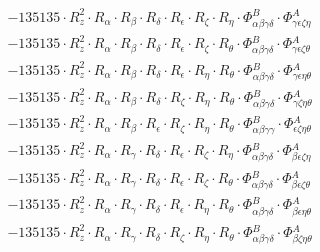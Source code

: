 \documentclass{article}
\begin{document}
\begin{subequations}
\begin{gather}
\begin{array}{c}
 \\[0.2em] 		 - 135135 \cdot R_{z}^{2} \cdot R_{\alpha{}} \cdot R_{\beta{}} \cdot R_{\delta{}} \cdot R_{\epsilon{}} \cdot R_{\zeta{}} \cdot R_{\eta{}} \cdot \Phi{}^{B}_{\alpha{}\beta{}\gamma{}\delta{}} \cdot \Phi{}^{A}_{\gamma{}\epsilon{}\zeta{}\eta{}} 
 \\[0.2em] 		 - 135135 \cdot R_{z}^{2} \cdot R_{\alpha{}} \cdot R_{\beta{}} \cdot R_{\delta{}} \cdot R_{\epsilon{}} \cdot R_{\zeta{}} \cdot R_{\theta{}} \cdot \Phi{}^{B}_{\alpha{}\beta{}\gamma{}\delta{}} \cdot \Phi{}^{A}_{\gamma{}\epsilon{}\zeta{}\theta{}} 
 \\[0.2em] 		 - 135135 \cdot R_{z}^{2} \cdot R_{\alpha{}} \cdot R_{\beta{}} \cdot R_{\delta{}} \cdot R_{\epsilon{}} \cdot R_{\eta{}} \cdot R_{\theta{}} \cdot \Phi{}^{B}_{\alpha{}\beta{}\gamma{}\delta{}} \cdot \Phi{}^{A}_{\gamma{}\epsilon{}\eta{}\theta{}} 
 \\[0.2em] 		 - 135135 \cdot R_{z}^{2} \cdot R_{\alpha{}} \cdot R_{\beta{}} \cdot R_{\delta{}} \cdot R_{\zeta{}} \cdot R_{\eta{}} \cdot R_{\theta{}} \cdot \Phi{}^{B}_{\alpha{}\beta{}\gamma{}\delta{}} \cdot \Phi{}^{A}_{\gamma{}\zeta{}\eta{}\theta{}} 
 \\[0.2em] 		 - 135135 \cdot R_{z}^{2} \cdot R_{\alpha{}} \cdot R_{\beta{}} \cdot R_{\epsilon{}} \cdot R_{\zeta{}} \cdot R_{\eta{}} \cdot R_{\theta{}} \cdot \Phi{}^{B}_{\alpha{}\beta{}\gamma{}\gamma{}} \cdot \Phi{}^{A}_{\epsilon{}\zeta{}\eta{}\theta{}} 
 \\[0.2em] 		 - 135135 \cdot R_{z}^{2} \cdot R_{\alpha{}} \cdot R_{\gamma{}} \cdot R_{\delta{}} \cdot R_{\epsilon{}} \cdot R_{\zeta{}} \cdot R_{\eta{}} \cdot \Phi{}^{B}_{\alpha{}\beta{}\gamma{}\delta{}} \cdot \Phi{}^{A}_{\beta{}\epsilon{}\zeta{}\eta{}} 
 \\[0.2em] 		 - 135135 \cdot R_{z}^{2} \cdot R_{\alpha{}} \cdot R_{\gamma{}} \cdot R_{\delta{}} \cdot R_{\epsilon{}} \cdot R_{\zeta{}} \cdot R_{\theta{}} \cdot \Phi{}^{B}_{\alpha{}\beta{}\gamma{}\delta{}} \cdot \Phi{}^{A}_{\beta{}\epsilon{}\zeta{}\theta{}} 
 \\[0.2em] 		 - 135135 \cdot R_{z}^{2} \cdot R_{\alpha{}} \cdot R_{\gamma{}} \cdot R_{\delta{}} \cdot R_{\epsilon{}} \cdot R_{\eta{}} \cdot R_{\theta{}} \cdot \Phi{}^{B}_{\alpha{}\beta{}\gamma{}\delta{}} \cdot \Phi{}^{A}_{\beta{}\epsilon{}\eta{}\theta{}} 
 \\[0.2em] 		 - 135135 \cdot R_{z}^{2} \cdot R_{\alpha{}} \cdot R_{\gamma{}} \cdot R_{\delta{}} \cdot R_{\zeta{}} \cdot R_{\eta{}} \cdot R_{\theta{}} \cdot \Phi{}^{B}_{\alpha{}\beta{}\gamma{}\delta{}} \cdot \Phi{}^{A}_{\beta{}\zeta{}\eta{}\theta{}} 

\end{array}
\end{gather}
\end{subequations}
\end{document}
